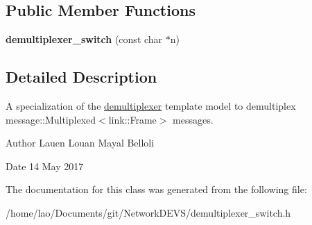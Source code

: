 \subsection*{Public Member Functions}
\begin{DoxyCompactItemize}
\item 
{\bfseries demultiplexer\+\_\+switch} (const char $\ast$n)\hypertarget{classdemultiplexer__switch_a7e1728adcdcb9628a53c66e2c2e8ad3d}{}\label{classdemultiplexer__switch_a7e1728adcdcb9628a53c66e2c2e8ad3d}

\end{DoxyCompactItemize}


\subsection{Detailed Description}
A specialization of the \hyperlink{classdemultiplexer}{demultiplexer} template model to demultiplex message\+::\+Multiplexed$<$link\+::\+Frame$>$ messages. 

\begin{DoxyAuthor}{Author}
Lauen Louan Mayal Belloli 
\end{DoxyAuthor}
\begin{DoxyDate}{Date}
14 May 2017 
\end{DoxyDate}


The documentation for this class was generated from the following file\+:\begin{DoxyCompactItemize}
\item 
/home/lao/\+Documents/git/\+Network\+D\+E\+V\+S/demultiplexer\+\_\+switch.\+h\end{DoxyCompactItemize}
